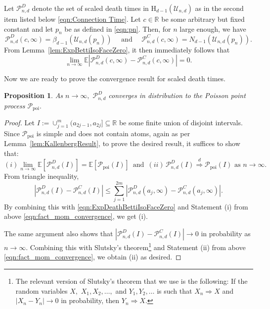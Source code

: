 \documentclass[12pt]{amsart}
\newcommand{\PoiP}{\mathscr{P}_{\text{poi}}}
\newcommand{\PoiF}{\mathscr{P}_{n, d}^{C}}
\newcommand{\PoiD}{\mathscr{P}_{n, d}^{D}}
\newtheorem{prop}[theorem]{Proposition}
\numberwithin{equation}{section}
\numberwithin{theorem}{section}
\newcommand{\Real}{\mathbb R}
\newcommand{\Hg}{\mathrm{H}}
\newcommand{\1}{\mathbf{1}}
\def\U{\mathcal{U}}
\begin{document}

Let $\PoiD$ denote the set of scaled death times in $\Hg_{d - 1}(\U_{n, d})$ as in the second item listed below  \eqref{eqn:Connection Time}. Let $c \in \Real$ be some arbitrary but fixed constant and let $p_n$ be as defined in \eqref{eqn:pn}. Then, for $n$ large enough, we have
%
$$\PoiD(c, \infty) = \beta_{d - 1}(\U_{n, d}(p_{n})) \quad \text{ and } \quad \PoiF(c, \infty) = N_{d - 1}(\U_{n, d}(p_{n})). $$
%
From Lemma~\ref{lem:ExpBettiIsoFaceZero}, it then immediately follows that 
%
\begin{equation}
\label{eqn:ExpDeathBettiIsoFaceZero}
    \lim_{n \to \infty}\mathbb{E}|\PoiD(c, \infty) - \PoiF(c, \infty)| = 0.
\end{equation}
	
Now we are ready to prove the convergence result for scaled death times.
%
\begin{prop}
\label{thm:DeathPoissonProcessConvergence}
As $n \to \infty,$ $\PoiD$ converges in distribution to the Poisson point process $\PoiP.$
\end{prop}
%
\begin{proof}
%
Let $I := \cup_{j = 1}^{m} (a_{2j-1}, a_{2j}] \subseteq \mathbb{R}$ be some finite union of disjoint intervals. Since $\PoiP$ is simple and does not contain atoms, again as per Lemma~\ref{lem:KallenbergResult}, to prove the desired result, it suffices to show that:
%
\[(i)  \lim_{n \to \infty} \mathbb{E}[\PoiD(I)] = \mathbb{E}[\PoiP(I)] \, \, \, \mbox{and} \, \, \,
(ii) \, \PoiD(I) \stackrel{d}{\Rightarrow} \PoiP(I) \, \, \mbox{as} \, \, n \to \infty.\]
%
From triangle inequality,
%
\begin{equation}
\label{eqn:Diff.PoiD.PoiF.Dist}
|\PoiD(I) - \PoiF(I)|  \leq \sum_{j = 1}^{2m}|\PoiD(a_j, \infty) - \PoiF(a_j, \infty)|.		
\end{equation}
%
By combining this with \eqref{eqn:ExpDeathBettiIsoFaceZero} and Statement (i) from above \eqref{eqn:fact_mom_convergence}, we get (i).
%

The same argument also shows that $|\PoiD(I) - \PoiF(I)| \to 0$ in probability as $n \to \infty.$ Combining this with Slutsky's theorem\footnote{The relevant version of Slutsky's theorem that we use is the following: If the random variables $X,$ $X_1, X_2, \ldots,$ and $Y_1, Y_2, \ldots$ is such that $X_n \Rightarrow X$ and $|X_n - Y_n| \to 0$ in probability, then $Y_n \Rightarrow X.$} \cite[Chapter 3, Corollary 3.3]{ethier2009markov} and Statement (ii) from above \eqref{eqn:fact_mom_convergence}, we obtain (ii) as desired.
\end{proof}
%
\end{document}

